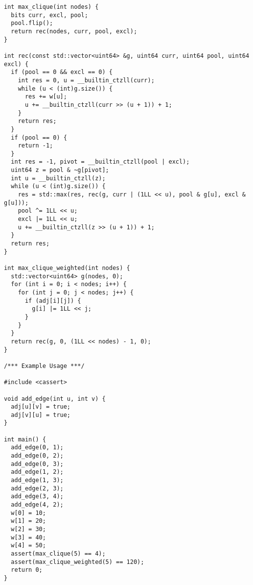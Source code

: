 \begin{lstlisting}
int max_clique(int nodes) {
  bits curr, excl, pool;
  pool.flip();
  return rec(nodes, curr, pool, excl);
}

int rec(const std::vector<uint64> &g, uint64 curr, uint64 pool, uint64 excl) {
  if (pool == 0 && excl == 0) {
    int res = 0, u = __builtin_ctzll(curr);
    while (u < (int)g.size()) {
      res += w[u];
      u += __builtin_ctzll(curr >> (u + 1)) + 1;
    }
    return res;
  }
  if (pool == 0) {
    return -1;
  }
  int res = -1, pivot = __builtin_ctzll(pool | excl);
  uint64 z = pool & ~g[pivot];
  int u = __builtin_ctzll(z);
  while (u < (int)g.size()) {
    res = std::max(res, rec(g, curr | (1LL << u), pool & g[u], excl & g[u]));
    pool ^= 1LL << u;
    excl |= 1LL << u;
    u += __builtin_ctzll(z >> (u + 1)) + 1;
  }
  return res;
}

int max_clique_weighted(int nodes) {
  std::vector<uint64> g(nodes, 0);
  for (int i = 0; i < nodes; i++) {
    for (int j = 0; j < nodes; j++) {
      if (adj[i][j]) {
        g[i] |= 1LL << j;
      }
    }
  }
  return rec(g, 0, (1LL << nodes) - 1, 0);
}

/*** Example Usage ***/

#include <cassert>

void add_edge(int u, int v) {
  adj[u][v] = true;
  adj[v][u] = true;
}

int main() {
  add_edge(0, 1);
  add_edge(0, 2);
  add_edge(0, 3);
  add_edge(1, 2);
  add_edge(1, 3);
  add_edge(2, 3);
  add_edge(3, 4);
  add_edge(4, 2);
  w[0] = 10;
  w[1] = 20;
  w[2] = 30;
  w[3] = 40;
  w[4] = 50;
  assert(max_clique(5) == 4);
  assert(max_clique_weighted(5) == 120);
  return 0;
}
\end{lstlisting}
